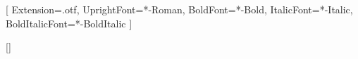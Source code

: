 
\usepackage[english]{babel}

\usepackage{geometry}
\geometry{
	a4paper,
	margin=15mm
}
\pagestyle{empty}

\setmainfont{XCharter}[
	Extension=.otf,
	UprightFont=*-Roman,
	BoldFont=*-Bold,
	ItalicFont=*-Italic,
	BoldItalicFont=*-BoldItalic
]

\usepackage{titlesec}
\titleformat{\subsection}{\Large\bfseries}{}{0pt}{}[\vspace{-0.5ex}\titlerule]
\titlespacing*{\subsection}{0pt}{2.5ex}{1ex}

\usepackage{enumitem}

\newcommand{\resumename}[1]{%
	\begin{center}
		{\fontsize{26pt}{30pt}\selectfont\bfseries #1}
	\end{center}
	\vspace{-1ex}%
}

\newcommand{\resumecontacts}[1]{%
	\begin{center}
		\small #1
	\end{center}
}

\newcommand{\entryheading}[2]{%
	\par\vspace{1ex}%
	\noindent\textbf{#1}\hfill\textit{#2}\par\nopagebreak
}

\newcommand{\entrysubheading}[2]{%
	\par\nopagebreak\vspace{-\parskip}\vspace{0.4ex}%
	\noindent\textit{#1}\hfill\textit{#2}\par\nopagebreak
}

